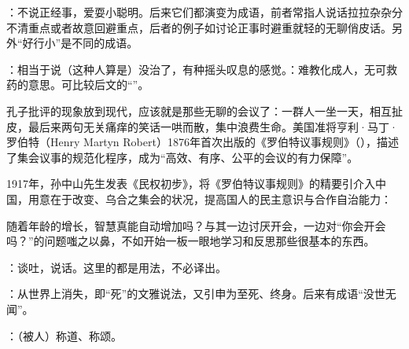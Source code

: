 {
\item {}：不说正经事，爱耍小聪明。后来它们都演变为成语，前者常指人说话拉拉杂杂分不清重点或者故意回避重点，后者的例子如讨论正事时避重就轻的无聊俏皮话。另外“好行小”是不同的成语。
\item {}：相当于说（这种人算是）没治了，有种摇头叹息的感觉。：难教化成人，无可救药的意思。可比较后文的“”。
}
{
孔子批评的现象放到现代，应该就是那些无聊的会议了：一群人一坐一天，相互扯皮，最后来两句无关痛痒的笑话一哄而散，集中浪费生命。美国准将亨利·马丁·罗伯特（Henry Martyn Robert）1876年首次出版的《罗伯特议事规则》（\emph{}），描述了集会议事的规范化程序，成为“高效、有序、公平的会议的有力保障”。

1917年，孙中山先生发表《民权初步》，将《罗伯特议事规则》的精要引介入中国，用意在于改变、乌合之集会的状况，提高国人的民主意识与合作自治能力：

随着年龄的增长，智慧真能自动增加吗？与其一边讨厌开会，一边对“你会开会吗？”的问题嗤之以鼻，不如开始一板一眼地学习和反思那些很基本的东西。
}


{
\item {}：谈吐，说话。这里的都是用法，不必译出。
}
{}


{
}
{}


{
\item {}：从世界上消失，即“死”的文雅说法，又引申为至死、终身。后来有成语“没世无闻”。
\item {}：（被人）称道、称颂。
}
{}


